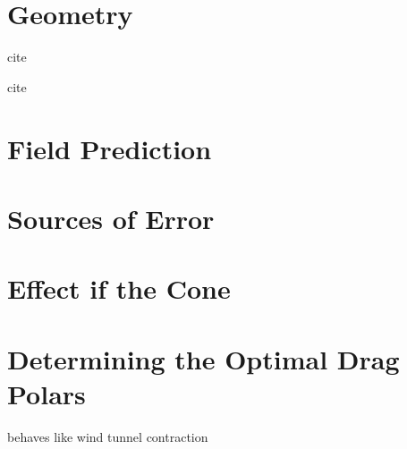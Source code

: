 \label{sec:field}

\section{Geometry}

cite

cite

\section{Field Prediction}

\section{Sources of Error}

\section{Effect if the Cone}

\section{Determining the Optimal Drag Polars}

behaves like wind tunnel contraction